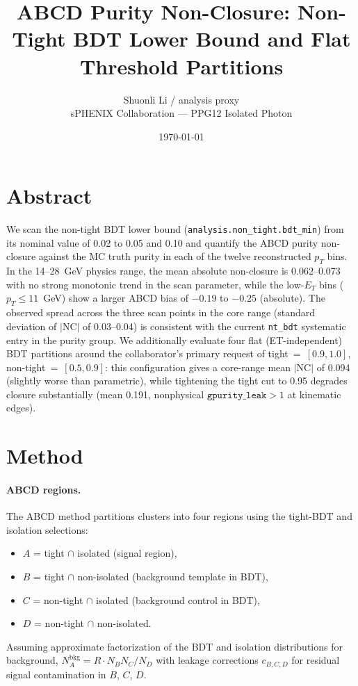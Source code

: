 \documentclass[11pt]{article}
\title{ABCD Purity Non-Closure: Non-Tight BDT Lower Bound and Flat Threshold Partitions}
\author{Shuonli Li / analysis proxy \\
        \small sPHENIX Collaboration --- PPG12 Isolated Photon}
\date{\today}
\makeatletter
\renewcommand{\maketitle}{%
  \begingroup
  \centering
  {\Large\bfseries \@title \par}\vspace{0.5ex}
  {\small \@author \par}\vspace{0.3ex}
  {\small \@date \par}\vspace{1ex}
  \endgroup
}
\makeatother
\begin{document}
\maketitle

\section{Abstract}

We scan the non-tight BDT lower bound (\texttt{analysis.non\_tight.bdt\_min}) from its nominal value of 0.02 to 0.05 and 0.10 and quantify the ABCD purity non-closure against the MC truth purity in each of the twelve reconstructed $p_T$ bins. In the 14--28~GeV physics range, the mean absolute non-closure is 0.062--0.073 with no strong monotonic trend in the scan parameter, while the low-$E_T$ bins ($p_T \le 11$~GeV) show a larger ABCD bias of $-0.19$ to $-0.25$ (absolute). The observed spread across the three scan points in the core range (standard deviation of $|\mathrm{NC}|$ of 0.03--0.04) is consistent with the current \texttt{nt\_bdt} systematic entry in the purity group. We additionally evaluate four flat (ET-independent) BDT partitions around the collaborator's primary request of tight~=~$[0.9, 1.0]$, non-tight~=~$[0.5, 0.9]$: this configuration gives a core-range mean $|\mathrm{NC}|$ of 0.094 (slightly worse than parametric), while tightening the tight cut to 0.95 degrades closure substantially (mean 0.191, nonphysical $\texttt{gpurity\_leak} > 1$ at kinematic edges).

\section{Method}

\paragraph{ABCD regions.}
The ABCD method partitions clusters into four regions using the tight-BDT and isolation selections:
\begin{itemize}
  \item $A$ = tight $\cap$ isolated (signal region),
  \item $B$ = tight $\cap$ non-isolated (background template in BDT),
  \item $C$ = non-tight $\cap$ isolated (background control in BDT),
  \item $D$ = non-tight $\cap$ non-isolated.
\end{itemize}
Assuming approximate factorization of the BDT and isolation distributions for background, $N^{\mathrm{bkg}}_A = R \cdot N_B N_C / N_D$ with leakage corrections $c_{B,C,D}$ for residual signal contamination in $B$, $C$, $D$.
\end{document}
